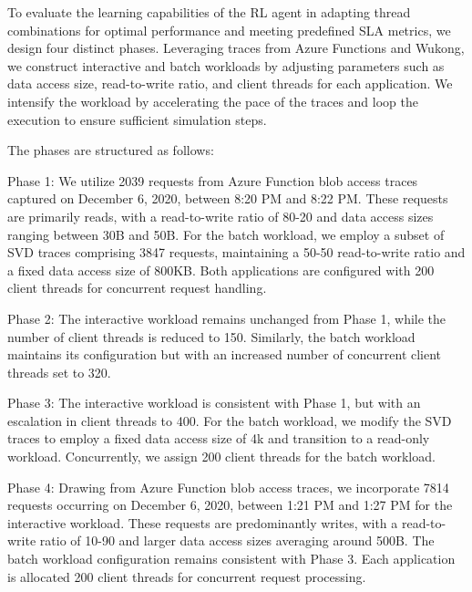\label{appendix:c}

To evaluate the learning capabilities of the RL agent in adapting thread combinations for optimal performance and meeting predefined SLA metrics, we design four distinct phases. Leveraging traces from Azure Functions and Wukong, we construct interactive and batch workloads by adjusting parameters such as data access size, read-to-write ratio, and client threads for each application. We intensify the workload by accelerating the pace of the traces and loop the execution to ensure sufficient simulation steps.

The phases are structured as follows:

Phase 1: We utilize 2039 requests from Azure Function blob access traces captured on December 6, 2020, between 8:20 PM and 8:22 PM. These requests are primarily reads, with a read-to-write ratio of 80-20 and data access sizes ranging between 30B and 50B. For the batch workload, we employ a subset of SVD traces comprising 3847 requests, maintaining a 50-50 read-to-write ratio and a fixed data access size of 800KB. Both applications are configured with 200 client threads for concurrent request handling.

Phase 2: The interactive workload remains unchanged from Phase 1, while the number of client threads is reduced to 150. Similarly, the batch workload maintains its configuration but with an increased number of concurrent client threads set to 320.

Phase 3: The interactive workload is consistent with Phase 1, but with an escalation in client threads to 400. For the batch workload, we modify the SVD traces to employ a fixed data access size of 4k and transition to a read-only workload. Concurrently, we assign 200 client threads for the batch workload.

Phase 4: Drawing from Azure Function blob access traces, we incorporate 7814 requests occurring on December 6, 2020, between 1:21 PM and 1:27 PM for the interactive workload. These requests are predominantly writes, with a read-to-write ratio of 10-90 and larger data access sizes averaging around 500B. The batch workload configuration remains consistent with Phase 3. Each application is allocated 200 client threads for concurrent request processing.




